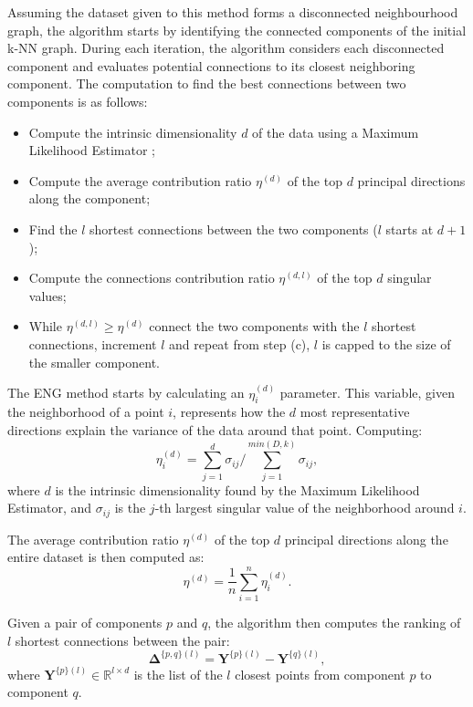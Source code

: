     Assuming the dataset given to this method forms a disconnected neighbourhood graph, the algorithm starts by identifying the connected components of the initial k-NN graph. During each iteration, the algorithm considers each disconnected component and evaluates potential connections to its closest neighboring component. The computation to find the best connections between two components is as follows:
    \begin{itemize}
        \item Compute the intrinsic dimensionality $d$ of the data using a Maximum Likelihood Estimator \cite{mle};
        \item Compute the average contribution ratio $\eta^{(d)}$ of the top $d$ principal directions along the component;
        \item Find the $l$ shortest connections between the two components ($l$ starts at $d+1$);
        \item Compute the connections contribution ratio $\eta^{(d, l)}$ of the top $d$ singular values;
        \item While $\eta^{(d, l)} \geq \eta^{(d)}$ connect the two components with the $l$ shortest connections, increment $l$ and repeat from step (c), $l$ is capped to the size of the smaller component.
    \end{itemize}
    
    The \ac{ENG} method starts by calculating an $\eta_i^{(d)}$ parameter. This variable, given the neighborhood of a point $i$, represents how the $d$ most representative directions explain the variance of the data around that point. Computing:
    \begin{equation}
        \eta_i^{(d)} = \sum_{j=1}^{d} \sigma_{ij} / \sum_{j=1}^{min(D,k)} \sigma_{ij},
    \end{equation}
    where $d$ is the intrinsic dimensionality found by the Maximum Likelihood Estimator, and $\sigma_{ij}$ is the $j$-th largest singular value of the neighborhood around $i$.

    The average contribution ratio $\eta^{(d)}$ of the top $d$ principal directions along the entire dataset is then computed as:
    \begin{equation}
        \eta^{(d)} = \frac{1}{n} \sum_{i=1}^{n} \eta_i^{(d)}.
    \end{equation}

    Given a pair of components $p$ and $q$, the algorithm then computes the ranking of $l$ shortest connections between the pair:
    \begin{equation}
        \boldsymbol{\Delta}^{\{p, q\} (l)} = \boldsymbol{Y}^{\{p\} (l)} - \boldsymbol{Y}^{\{q\} (l)},
    \end{equation}
    where $\boldsymbol{Y}^{\{p\} (l)} \in \mathbb{R}^{l \times d}$ is the list of the $l$ closest points from component $p$ to component $q$.

